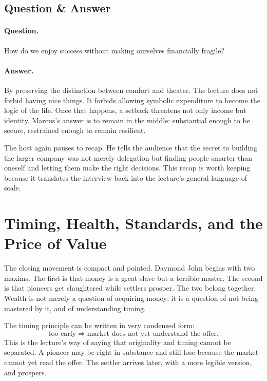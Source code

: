 \subsection{Question \& Answer}

\paragraph{Question.} How do we enjoy success without making ourselves financially fragile?

\paragraph{Answer.} By preserving the distinction between comfort and theater. The lecture does not forbid having nice things. It forbids allowing symbolic expenditure to become the logic of the life. Once that happens, a setback threatens not only income but identity. Marcus's answer is to remain in the middle: substantial enough to be secure, restrained enough to remain resilient.

The host again pauses to recap. He tells the audience that the secret to building the larger company was not merely delegation but finding people smarter than oneself and letting them make the right decisions. This recap is worth keeping because it translates the interview back into the lecture's general language of scale.

\section{Timing, Health, Standards, and the Price of Value}

The closing movement is compact and pointed. Daymond John begins with two maxims. The first is that money is a great slave but a terrible master. The second is that pioneers get slaughtered while settlers prosper. The two belong together. Wealth is not merely a question of acquiring money; it is a question of not being mastered by it, and of understanding timing.

The timing principle can be written in very condensed form:
\begin{equation}
\text{too early} \Rightarrow \text{market does not yet understand the offer}.
\end{equation}
This is the lecture's way of saying that originality and timing cannot be separated. A pioneer may be right in substance and still lose because the market cannot yet read the offer. The settler arrives later, with a more legible version, and prospers.

